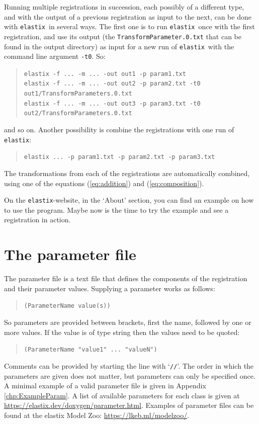 \documentclass[]{report}
\newcommand{\elastix}{\texttt{elastix}}
\begin{document}
Running multiple registrations in succession, each possibly of a
different type, and with the output of a previous registration as
input to the next, can be done with \elastix\ in several ways. The
first one is to run \elastix\ once with the first registration, and
use its output (the \texttt{TransformParameter.0.txt} that can be
found in the output directory) as input for a new run of \elastix\
with the command line argument \texttt{-t0}. So:
\begin{quote}
\texttt{elastix -f ... -m ... -out out1 -p param1.txt} \\
\texttt{elastix -f ... -m ... -out out2 -p param2.txt -t0
out1/TransformParameters.0.txt} \\
\texttt{elastix -f ... -m ... -out out3 -p param3.txt -t0
out2/TransformParameters.0.txt}
\end{quote}
and so on. Another possibility is combine the registrations with one
run of \elastix:
\begin{quote}
\texttt{elastix ... -p param1.txt -p param2.txt -p param3.txt}
\end{quote}
The transformations from each of the registrations are automatically
combined, using one of the equations (\ref{eq:addition}) and
(\ref{eq:composition}).

On the \elastix-website, in the `About' section, you can find an
example on how to use the program. Maybe now is the time to try
the example and see a registration in action.


\section{The parameter file}\label{sec:elastix:param}

The parameter file is a text file that defines the components of the
registration and their parameter values. Supplying a parameter works
as follows:
\begin{quote}
\texttt{(ParameterName value(s))}
\end{quote}
So parameters are provided between brackets, first the name,
followed by one or more values. If the value is of type string then
the values need to be quoted:
\begin{quote}
\texttt{(ParameterName "value1" ... "valueN")}
\end{quote}
Comments can be provided by starting the line with `\texttt{//}'.
The order in which the parameters are given does not matter, but
parameters can only be specified once. A minimal example of a valid
parameter file is given in Appendix \ref{chp:ExampleParam}. A list
of available parameters for each class is given at
\url{https://elastix.dev/doxygen/parameter.html}. Examples of
parameter files can be found at the elastix Model Zoo:
\url{https://lkeb.ml/modelzoo/}.
\end{document}
